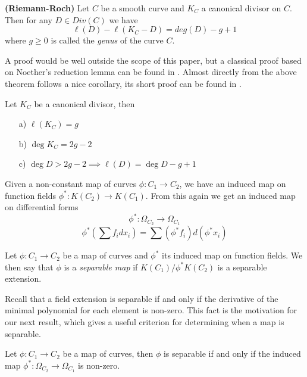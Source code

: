\begin{thm}
 \textbf{(Riemann-Roch)}
  Let $C$ be a smooth curve and $K_C$ a canonical divisor on $C$. Then for
any $D \in Div(C)$ we have
$$ \ell(D) - \ell(K_C - D) = deg(D) - g + 1 $$
where $g \geq 0$ is called the \emph{genus} of the curve $C$.
\end{thm}

 A proof would be well outside the scope of this paper, but a classical proof based
on Noether's reduction lemma can be found in \cite{Fulton}. Almost directly from the
above theorem follows a nice corollary, its short proof can be found in \cite{AEC}.

\begin{cor} \label{rrcor}
Let $K_C$ be a canonical divisor, then
 \begin{enumerate}
  \item[a)] $\ell(K_C) = g$
  \item[b)] $\deg K_C = 2g - 2$
  \item[c)] $\deg D > 2g - 2 \implies \ell(D) = \deg D - g + 1$ 
 \end{enumerate}
\end{cor}

Given a non-constant map of curves $\phi: C_1 \rightarrow C_2$, we have an induced map
on function fields $\phi^*: K(C_2) \rightarrow K(C_1)$. From this again we get an induced
map on differential forms
$$ \phi^*: \Omega_{C_2} \rightarrow \Omega_{C_1} $$
$$ \phi^*\left(\sum f_i dx_i\right) = \sum (\phi^* f_i) d(\phi^* x_i) $$
\label{diff}

\begin{mydef} 
 Let $\phi: C_1 \rightarrow C_2$ be a map of curves and $\phi^*$ its induced map on
function fields. We then say that $\phi$ is a \emph{separable map} if
$K(C_1)/\phi^* K(C_2)$ is a separable extension.
\end{mydef}

Recall that a field extension is separable if and only if the derivative of the minimal
polynomial for each element is non-zero. This fact is the motivation for our next result,
which gives a useful criterion for determining when a map is separable.

\begin{prop} \label{diffsep}
 Let $\phi: C_1 \rightarrow C_2$ be a map of curves, then $\phi$ is separable if and only if
the induced map $\phi^*: \Omega_{C_2} \rightarrow \Omega_{C_1} $ is non-zero.
\end{prop}

